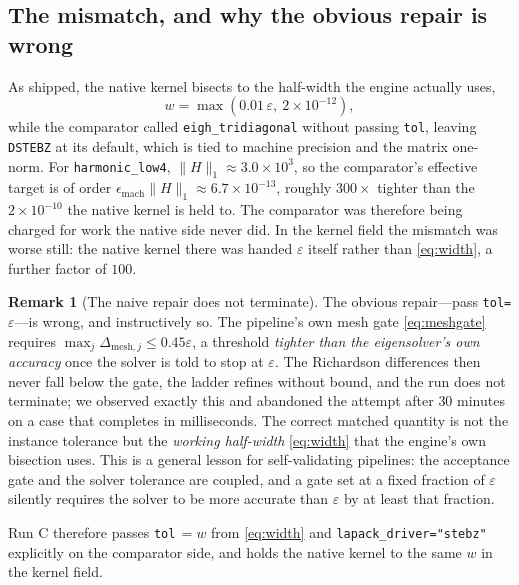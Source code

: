 \documentclass[twocolumn,10pt,a4paper]{article}
\theoremstyle{plain}
\theoremstyle{definition}
\newtheorem{remark}{Remark}
\newcommand{\eps}{\varepsilon}
\begin{document}
\subsection{The mismatch, and why the obvious repair is wrong}
\label{sec:matched}

As shipped, the native kernel bisects to the half-width the engine actually
uses,
\begin{equation}
w = \max(0.01\,\eps,\ 2\times10^{-12}),
\label{eq:width}
\end{equation}
while the comparator called \texttt{eigh\_tridiagonal} without passing
\texttt{tol}, leaving \texttt{DSTEBZ} at its default, which is tied to machine
precision and the matrix one-norm. For \texttt{harmonic\_low4}, $\|H\|_{1}
\approx 3.0\times10^{3}$, so the comparator's effective target is of order
$\epsilon_{\mathrm{mach}}\|H\|_{1} \approx 6.7\times10^{-13}$, roughly
$300\times$ tighter than the $2\times10^{-10}$ the native kernel is held to.
The comparator was therefore being charged for work the native side never did.
In the kernel field the mismatch was worse still: the native kernel there was
handed $\eps$ itself rather than \eqref{eq:width}, a further factor of $100$.

\begin{remark}[The naive repair does not terminate]
\label{rem:hang}
The obvious repair---pass \texttt{tol=}$\eps$---is wrong, and instructively so.
The pipeline's own mesh gate \eqref{eq:meshgate} requires
$\max_{j}\Delta_{\mathrm{mesh},j} \le 0.45\eps$, a threshold \emph{tighter than
the eigensolver's own accuracy} once the solver is told to stop at $\eps$. The
Richardson differences then never fall below the gate, the ladder refines
without bound, and the run does not terminate; we observed exactly this and
abandoned the attempt after $30$ minutes on a case that completes in
milliseconds. The correct matched quantity is not the instance tolerance but the
\emph{working half-width} \eqref{eq:width} that the engine's own bisection uses.
This is a general lesson for self-validating pipelines: the acceptance gate and
the solver tolerance are coupled, and a gate set at a fixed fraction of $\eps$
silently requires the solver to be more accurate than $\eps$ by at least that
fraction.
\end{remark}

Run C therefore passes \texttt{tol}$\,=w$ from \eqref{eq:width} and
\texttt{lapack\_driver="stebz"} explicitly on the comparator side, and holds the
native kernel to the same $w$ in the kernel field.
\end{document}
